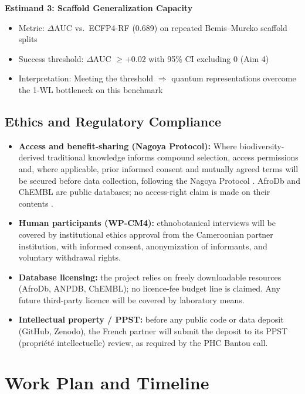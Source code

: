 \documentclass[11pt,a4paper]{article}
\begin{document}
\textbf{Estimand 3: Scaffold Generalization Capacity}
\begin{itemize}
    \item Metric: $\Delta$AUC vs.\ ECFP4-RF (0.689) on repeated Bemis--Murcko scaffold splits \cite{bemis1996}
    \item Success threshold: $\Delta$AUC $\geq +0.02$ with 95\% CI excluding 0 (Aim 4)
    \item Interpretation: Meeting the threshold $\Rightarrow$ quantum representations overcome the 1-WL bottleneck on this benchmark
\end{itemize}

\subsection{Ethics and Regulatory Compliance}
\label{sec:ethics}

\begin{itemize}
    \item \textbf{Access and benefit-sharing (Nagoya Protocol):} Where biodiversity-derived traditional knowledge informs compound selection, access permissions and, where applicable, prior informed consent and mutually agreed terms will be secured before data collection, following the Nagoya Protocol \cite{nagoya2011}. AfroDb and ChEMBL are public databases; no access-right claim is made on their contents \cite{ntiekang2013,mendez2019}.
    \item \textbf{Human participants (WP-CM4):} ethnobotanical interviews will be covered by institutional ethics approval from the Cameroonian partner institution, with informed consent, anonymization of informants, and voluntary withdrawal rights.
    \item \textbf{Database licensing:} the project relies on freely downloadable resources (AfroDb, ANPDB, ChEMBL); no licence-fee budget line is claimed. Any future third-party licence will be covered by laboratory means.
    \item \textbf{Intellectual property / PPST:} before any public code or data deposit (GitHub, Zenodo), the French partner will submit the deposit to its PPST (propriété intellectuelle) review, as required by the PHC Bantou call.
\end{itemize}

\section{Work Plan and Timeline}
\label{sec:plan}
\end{document}

